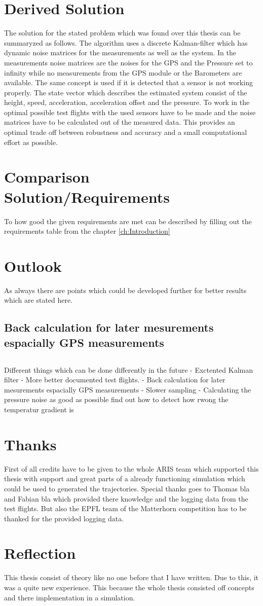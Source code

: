 \section{Derived Solution}
The solution for the stated problem which was found over this thesis can be summaryzed as follows.
The algorithm uses a discrete Kalman-filter which has dynamic noise matrices for the measurements as well as the system.
In the measurements noise matrices are the noises for the GPS and the Pressure set to infinity while no measurements from the GPS module or the Barometers are available.
The same concept is used if it is detected that a sensor is not working properly.
The state vector which describes the estimated system consist of the height, speed, acceleration, acceleration offset and the pressure.
To work in the optimal possible test flights with the used sensors have to be made and the noise matrices have to be calculated out of the measured data.
This provides an optimal trade off between robustness and accuracy and a small computational effort as possible.

\section{Comparison Solution/Requirements}
To how good the given requirements are met can be described by filling out the requirements table from the chapter \ref{ch:Introduction}



\section{Outlook}
As always there are points which could be developed further for better results which are stated here.
\subsection{Back calculation for later mesurements espacially GPS measurements}
\subsection{}
Different things which can be done differently in the future
- Exctented Kalman filter
- More better documented test flights.
- Back calculation for later mesurements espacially GPS measurements
- Slower sampling
- Calculating the pressure noise as good as possible find out how to detect how rwong the temperatur gradient is

\section{Thanks}
First of all credits have to be given to the whole ARIS team which supported this thesis with support
and great parts of a already functioning simulation which could be used to generated the trajectories.
Special thanks goes to Thomas bla and Fabian bla which provided there knowledge and the logging data from the test flights.
But also the EPFL team of the Matterhorn competition has to be thanked for the provided logging data.

\section{Reflection}
This thesis consist of theory like no one before that I have written.
Due to this, it was a quite new experience. 
This because the whole thesis consisted off concepts and there implementation in a simulation.
